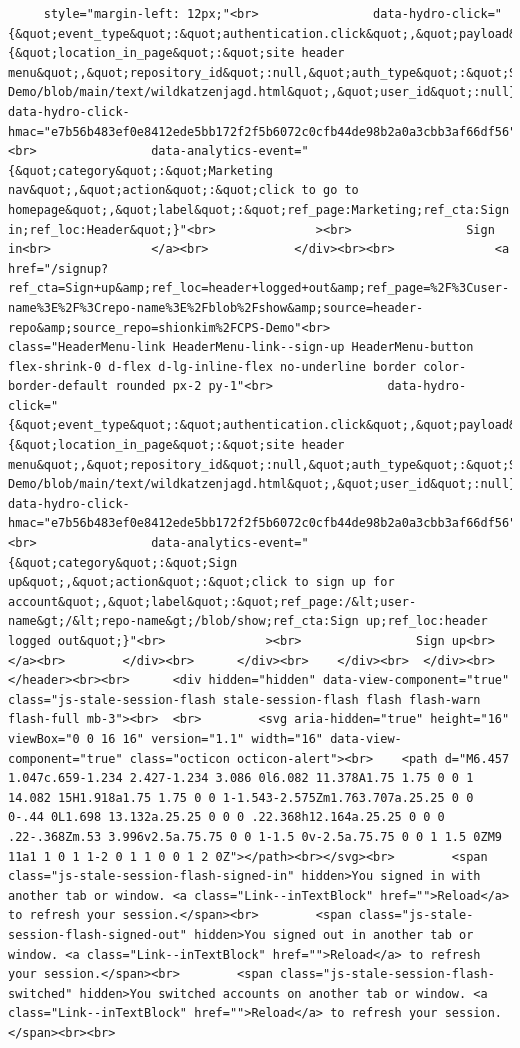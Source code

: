 \documentclass[
  letterpaper,
]{book}
\begin{document}
\begin{verbatim}
     style="margin-left: 12px;"<br>                data-hydro-click="{&quot;event_type&quot;:&quot;authentication.click&quot;,&quot;payload&quot;:{&quot;location_in_page&quot;:&quot;site header menu&quot;,&quot;repository_id&quot;:null,&quot;auth_type&quot;:&quot;SIGN_UP&quot;,&quot;originating_url&quot;:&quot;https://github.com/shionkim/CPS-Demo/blob/main/text/wildkatzenjagd.html&quot;,&quot;user_id&quot;:null}}" data-hydro-click-hmac="e7b56b483ef0e8412ede5bb172f2f5b6072c0cfb44de98b2a0a3cbb3af66df56"<br>                data-analytics-event="{&quot;category&quot;:&quot;Marketing nav&quot;,&quot;action&quot;:&quot;click to go to homepage&quot;,&quot;label&quot;:&quot;ref_page:Marketing;ref_cta:Sign in;ref_loc:Header&quot;}"<br>              ><br>                Sign in<br>              </a><br>            </div><br><br>              <a href="/signup?ref_cta=Sign+up&amp;ref_loc=header+logged+out&amp;ref_page=%2F%3Cuser-name%3E%2F%3Crepo-name%3E%2Fblob%2Fshow&amp;source=header-repo&amp;source_repo=shionkim%2FCPS-Demo"<br>                class="HeaderMenu-link HeaderMenu-link--sign-up HeaderMenu-button flex-shrink-0 d-flex d-lg-inline-flex no-underline border color-border-default rounded px-2 py-1"<br>                data-hydro-click="{&quot;event_type&quot;:&quot;authentication.click&quot;,&quot;payload&quot;:{&quot;location_in_page&quot;:&quot;site header menu&quot;,&quot;repository_id&quot;:null,&quot;auth_type&quot;:&quot;SIGN_UP&quot;,&quot;originating_url&quot;:&quot;https://github.com/shionkim/CPS-Demo/blob/main/text/wildkatzenjagd.html&quot;,&quot;user_id&quot;:null}}" data-hydro-click-hmac="e7b56b483ef0e8412ede5bb172f2f5b6072c0cfb44de98b2a0a3cbb3af66df56"<br>                data-analytics-event="{&quot;category&quot;:&quot;Sign up&quot;,&quot;action&quot;:&quot;click to sign up for account&quot;,&quot;label&quot;:&quot;ref_page:/&lt;user-name&gt;/&lt;repo-name&gt;/blob/show;ref_cta:Sign up;ref_loc:header logged out&quot;}"<br>              ><br>                Sign up<br>              </a><br>        </div><br>      </div><br>    </div><br>  </div><br></header><br><br>      <div hidden="hidden" data-view-component="true" class="js-stale-session-flash stale-session-flash flash flash-warn flash-full mb-3"><br>  <br>        <svg aria-hidden="true" height="16" viewBox="0 0 16 16" version="1.1" width="16" data-view-component="true" class="octicon octicon-alert"><br>    <path d="M6.457 1.047c.659-1.234 2.427-1.234 3.086 0l6.082 11.378A1.75 1.75 0 0 1 14.082 15H1.918a1.75 1.75 0 0 1-1.543-2.575Zm1.763.707a.25.25 0 0 0-.44 0L1.698 13.132a.25.25 0 0 0 .22.368h12.164a.25.25 0 0 0 .22-.368Zm.53 3.996v2.5a.75.75 0 0 1-1.5 0v-2.5a.75.75 0 0 1 1.5 0ZM9 11a1 1 0 1 1-2 0 1 1 0 0 1 2 0Z"></path><br></svg><br>        <span class="js-stale-session-flash-signed-in" hidden>You signed in with another tab or window. <a class="Link--inTextBlock" href="">Reload</a> to refresh your session.</span><br>        <span class="js-stale-session-flash-signed-out" hidden>You signed out in another tab or window. <a class="Link--inTextBlock" href="">Reload</a> to refresh your session.</span><br>        <span class="js-stale-session-flash-switched" hidden>You switched accounts on another tab or window. <a class="Link--inTextBlock" href="">Reload</a> to refresh your session.</span><br><br>   
\end{verbatim}
\end{document}
